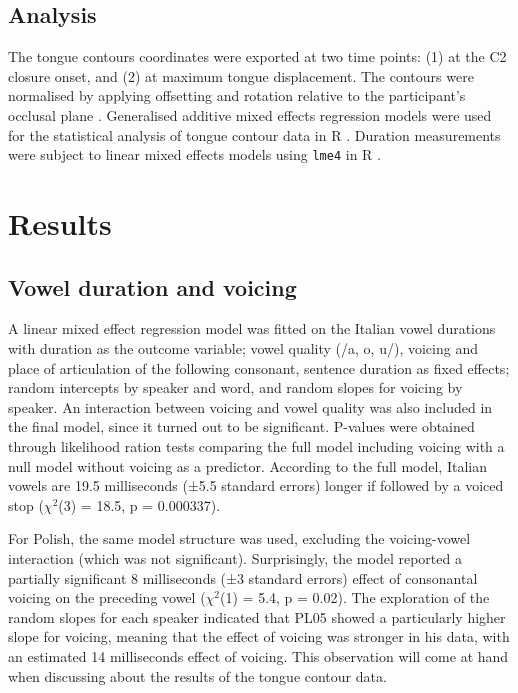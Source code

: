 \documentclass[authoryear, twocolumn]{elsarticle}
\begin{document}
\subsection{Analysis}\label{analysis}

The tongue contours coordinates were exported at two time points: (1) at
the C2 closure onset, and (2) at maximum tongue displacement. The
contours were normalised by applying offsetting and rotation relative to
the participant's occlusal plane \citep{scobbie2011}. Generalised
additive mixed effects regression models \citep{wood2006} were used for
the statistical analysis of tongue contour data in R
\citep{r-core-team2017}. Duration measurements were subject to linear
mixed effects models using \texttt{lme4} in R \citep{bates2015}.

\section{Results}\label{results}

\subsection{Vowel duration and
voicing}\label{vowel-duration-and-voicing}

A linear mixed effect regression model was fitted on the Italian vowel
durations with duration as the outcome variable; vowel quality (/a, o,
u/), voicing and place of articulation of the following consonant,
sentence duration as fixed effects; random intercepts by speaker and
word, and random slopes for voicing by speaker. An interaction between
voicing and vowel quality was also included in the final model, since it
turned out to be significant. P-values were obtained through likelihood
ration tests comparing the full model including voicing with a null
model without voicing as a predictor. According to the full model,
Italian vowels are 19.5 milliseconds (±5.5 standard errors) longer if
followed by a voiced stop (\(\chi^2\)(3) = 18.5, p = 0.000337).

For Polish, the same model structure was used, excluding the
voicing-vowel interaction (which was not significant). Surprisingly, the
model reported a partially significant 8 milliseconds (±3 standard
errors) effect of consonantal voicing on the preceding vowel
(\(\chi^2\)(1) = 5.4, p = 0.02). The exploration of the random slopes
for each speaker indicated that PL05 showed a particularly higher slope
for voicing, meaning that the effect of voicing was stronger in his
data, with an estimated 14 milliseconds effect of voicing. This
observation will come at hand when discussing about the results of the
tongue contour data.
\end{document}
